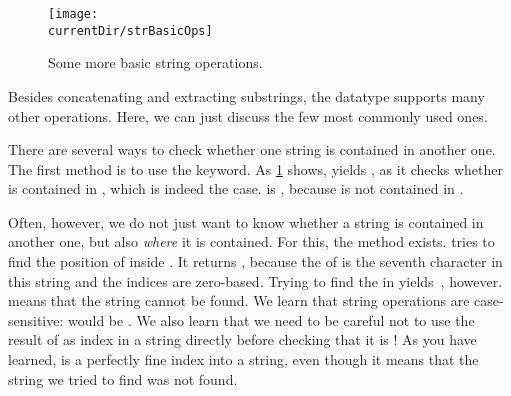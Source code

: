 \begin{figure}%
\centering%
\texttt{[image: \\currentDir/strBasicOps]}%
\caption{Some more basic string operations.}%
\label{fig:strBasicOps}%
\end{figure}%

Besides concatenating and extracting substrings, the  datatype supports many other operations.
Here, we can just discuss the few most commonly used ones.

There are several ways to check whether one string is contained in another one.
The first method is to use the  keyword.
As \cref{fig:strBasicOps} shows,  yields , as it checks whether  is contained in , which is indeed the case.
 is , because  is not contained in .

Often, however, we do not just want to know whether a string is contained in another one, but also \emph{where} it is contained.
For this, the  method exists.
 tries to find the position of  inside .
It returns , because the  of  is the seventh character in this string and the indices are zero-based.
Trying to find the  in  yields~, however.
 means that the string cannot be found.
We learn that string operations are case-sensitive:
 would be .
We also learn that we need to be careful not to use the result of  as index in a string directly before checking that it is !
As you have learned,  is a perfectly fine index into a string, even though it means that the string we tried to find was not found.

